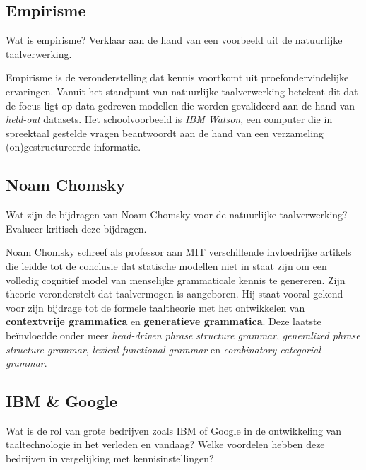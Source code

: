\documentclass[../main.tex]{subfiles}
\begin{document}
\subsection{Empirisme}
\begin{question}
Wat is empirisme? Verklaar aan de hand van een voorbeeld uit de natuurlijke taalverwerking.
\end{question}

\begin{solution}
Empirisme is de veronderstelling dat kennis voortkomt uit proefondervindelijke ervaringen.
Vanuit het standpunt van natuurlijke taalverwerking betekent dit dat de focus ligt op data-gedreven modellen die worden gevalideerd aan de hand van \emph{held-out} datasets.
Het schoolvoorbeeld is \emph{IBM Watson}, een computer die in spreektaal gestelde vragen beantwoordt aan de hand van een verzameling (on)gestructureerde informatie.
\end{solution}

\subsection{Noam Chomsky}
\begin{question}
Wat zijn de bijdragen van Noam Chomsky voor de natuurlijke taalverwerking?
Evalueer kritisch deze bijdragen.
\end{question}

\begin{solution}
Noam Chomsky schreef als professor aan MIT verschillende invloedrijke artikels die leidde tot de conclusie dat statische modellen niet in staat zijn om een volledig cognitief model van menselijke grammaticale kennis te genereren.
Zijn theorie veronderstelt dat taalvermogen is aangeboren.
Hij staat vooral gekend voor zijn bijdrage tot de formele taaltheorie met het ontwikkelen van \textbf{contextvrije grammatica} en \textbf{generatieve grammatica}. Deze laatste beïnvloedde onder meer \emph{head-driven phrase structure grammar}, \emph{generalized phrase structure grammar}, \emph{lexical functional grammar} en \emph{combinatory categorial grammar}.
\end{solution}

\subsection{IBM \& Google}
\begin{question}
Wat is de rol van grote bedrijven zoals IBM of Google in de ontwikkeling van taaltechnologie in het verleden en vandaag?
Welke voordelen hebben deze bedrijven in vergelijking met kennisinstellingen?
\end{question}
\end{document}
